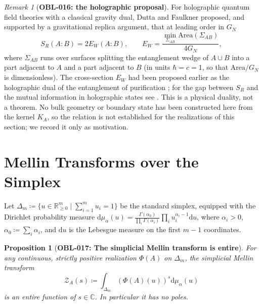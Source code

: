 \documentclass[11pt,a4paper,reqno]{amsart}
\newtheorem{proposition}[theorem]{Proposition}
\theoremstyle{definition}
\theoremstyle{remark}
\newtheorem{remark}[theorem]{Remark}
\numberwithin{equation}{section}
\newcommand{\dif}{\mathrm{d}}
\begin{document}
\begin{remark}[\textbf{OBL-016: the holographic proposal}]
\label{thm:holographic_ew_inequality}
For holographic quantum field theories with a classical gravity dual, Dutta and Faulkner \cite{DuttaFaulkner2019} proposed, and supported by a gravitational replica argument, that at leading order in $G_N$
\begin{equation}
S_R(A : B) = 2 E_W(A : B), \qquad E_W = \frac{\min_{\Sigma_{AB}} \mathrm{Area}(\Sigma_{AB})}{4 G_N},
\end{equation}
where $\Sigma_{AB}$ runs over surfaces splitting the entanglement wedge of $A \cup B$ into a part adjacent to $A$ and a part adjacent to $B$ (in units $\hbar = c = 1$, so that $\mathrm{Area}/G_N$ is dimensionless). The cross-section $E_W$ had been proposed earlier as the holographic dual of the entanglement of purification \cite{UmemotoTakayanagi2018,NguyenEtAl2018}; for the gap between $S_R$ and the mutual information in holographic states see \cite{AkersRath2020,HaydenParrikarSorce2021}. This is a physical duality, not a theorem. No bulk geometry or boundary state has been constructed here from the kernel $K_A$, so the relation is not established for the realizations of this section; we record it only as motivation.
\end{remark}

\section{Mellin Transforms over the Simplex}
\label{sec:simplicial}

Let $\Delta_m \coloneqq \{ u \in \mathbb{R}_{\ge 0}^m \mid \sum_{i=1}^m u_i = 1 \}$ be the standard simplex, equipped with the Dirichlet probability measure $\dif\mu_\alpha(u) = \frac{\Gamma(\alpha_0)}{\prod_i \Gamma(\alpha_i)} \prod_i u_i^{\alpha_i - 1} \dif u$, where $\alpha_i > 0$, $\alpha_0 \coloneqq \sum_i \alpha_i$, and $\dif u$ is the Lebesgue measure on the first $m-1$ coordinates.

\begin{proposition}[\textbf{OBL-017: The simplicial Mellin transform is entire}]
\label{prop:simplicial_mellin_conv}
For any continuous, strictly positive realization $\Phi(A)$ on $\Delta_m$, the simplicial Mellin transform
\begin{equation}
\mathcal{Z}_A(s) \coloneqq \int_{\Delta_m} \left( \Phi(A)(u) \right)^s \dif\mu_\alpha(u)
\end{equation}
is an entire function of $s \in \mathbb{C}$. In particular it has no poles.
\end{proposition}
\end{document}
